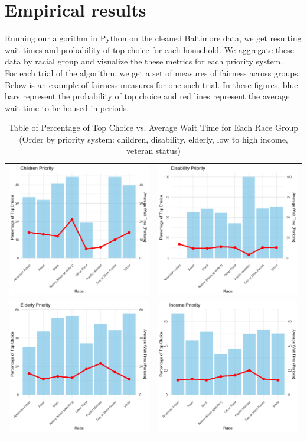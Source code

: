 \documentclass[11pt]{article}
\begin{document}
\newpage
\section{Empirical results}
Running our algorithm in Python on the cleaned Baltimore data, we get resulting wait times and probability of top choice for each household. We aggregate these data by racial group and visualize the these metrics for each priority system. \\
\newline
For each trial of the algorithm, we get a set of measures of fairness across groups. Below is an example of fairness measures for one such trial. In these figures, blue bars represent the probability of top choice and red lines represent the average wait time to be housed in periods.
        \begin{table}[h]
            \centering
                \caption{Table of Percentage of Top Choice vs. Average Wait Time for Each Race Group \\
                (Order by priority system: children, disability, elderly, low to high income, veteran status)}
                \vspace{1.1em}
                \begin{tabular}{cc}
                    \includegraphics[width=0.33\linewidth]{Children.png}
                    & \includegraphics[width=0.33\linewidth]{Disability.png} \\[-4pt]
                    \includegraphics[width=0.33\linewidth]{Elderly.png} & \includegraphics[width=0.33\linewidth]{Income.png} 

\end{tabular}
\end{table}
\end{document}
